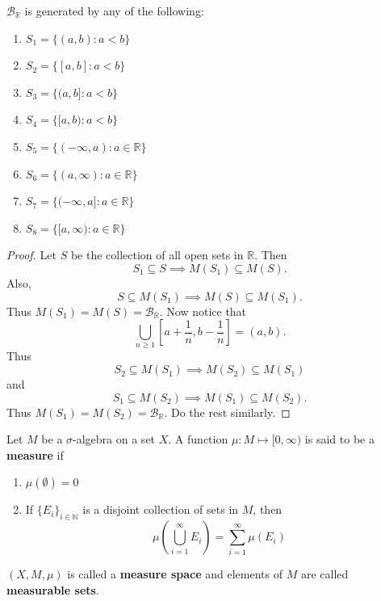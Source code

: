 \documentclass{functionspaces}
\begin{document}
\begin{proposition}
\( \mathcal{B}_{\mathbb{R}} \) is generated by any of the following:
\begin{enumerate}
    \item \( S_{1} = \{(a,b) : a < b\} \)
    \item \( S_{2} = \{[a,b] : a < b\} \)
    \item \( S_{3} = \{(a,b] : a < b\} \)
    \item \( S_{4} = \{[a,b) : a < b\} \)
    \item \( S_{5} = \{(-\infty,a) : a \in \mathbb{R}\} \)
    \item \( S_{6} = \{(a,\infty) : a \in \mathbb{R}\} \)
    \item \( S_{7} = \{(-\infty,a] : a \in \mathbb{R}\} \)
    \item \( S_{8} = \{[a,\infty) : a \in \mathbb{R}\} \)
\end{enumerate}
\end{proposition}

\begin{proof}
Let \( S \) be the collection of all open sets in \( \mathbb{R} \). Then
\[
S_{1} \subseteq S \implies M(S_{1}) \subseteq M(S).
\]
Also,
\[
S \subseteq M(S_{1}) \implies M(S) \subseteq M(S_{1}).
\]
Thus \( M(S_{1}) = M(S) = \mathcal{B}_{\mathbb{R}} \). Now notice that
\[
\bigcup_{n \geq 1} \left[a + \frac{1}{n}, b - \frac{1}{n}\right] = (a,b).
\]
Thus
\[
S_{2} \subseteq M(S_{1}) \implies M(S_{2}) \subseteq M(S_{1})
\]
and
\[
S_{1} \subseteq M(S_{2}) \implies M(S_{1}) \subseteq M(S_{2}).
\]
Thus \( M(S_{1}) = M(S_{2}) = \mathcal{B}_{\mathbb{R}} \). Do the rest similarly.
\end{proof}

\begin{definition}[Measure]
Let \( M \) be a \(\sigma\)-algebra on a set \( X \). A function \( \mu : M \mapsto [0,\infty) \) is said to be a \textbf{measure} if
\begin{enumerate}
    \item \( \mu(\emptyset) = 0 \)
    \item If \( \{E_{i}\}_{i \in \mathbb{N}} \) is a disjoint collection of sets in \( M \), then
    \[
    \mu\left( \bigcup_{i=1}^{\infty} E_{i} \right) = \sum_{i=1}^{\infty} \mu(E_{i})
    \]
\end{enumerate}
\( (X, M, \mu) \) is called a \textbf{measure space} and elements of \( M \) are called \textbf{measurable sets}.
\end{definition}
\end{document}
